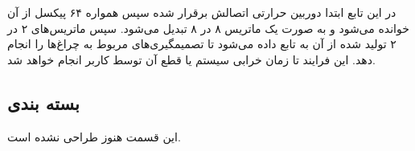 در این تابع ابتدا دوربین حرارتی اتصالش برقرار شده سپس همواره ۶۴ پیکسل از آن خوانده می‌شود و به صورت یک ماتریس ۸ در ۸ تبدیل می‌شود. سپس ماتریس‌های ۲ در ۲ تولید شده از آن به تابع  داده می‌شود تا تصمیمگیری‌های مربوط به چراغ‌ها را انجام دهد. این فرایند تا زمان خرابی سیستم یا قطع آن توسط کاربر انجام خواهد شد.



\subsection{بسته بندی}
این قسمت هنوز طراحی نشده است.

